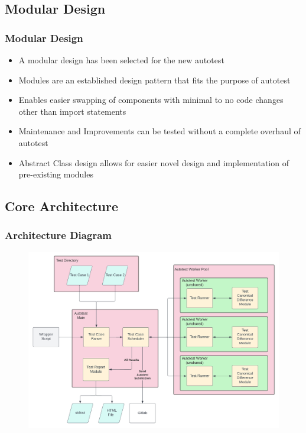 \documentclass[xcolor, handout]{beamer}
\begin{document}
\subsection{Modular Design}
\begin{frame}
	\frametitle{Modular Design}
	\begin{itemize}
		\item A modular design has been selected for the new autotest
			\pause
		\item Modules are an established design pattern that fits the purpose of autotest
			\pause
		\item Enables easier swapping of components with minimal to no code changes other than import statements
			\pause
		\item Maintenance and Improvements can be tested without a complete overhaul of autotest
			\pause
		\item Abstract Class design allows for easier novel design and implementation of pre-existing modules
	\end{itemize}
\end{frame}
\subsection{Core Architecture}
\begin{frame}
	\frametitle{Architecture Diagram}
	\begin{figure}
		\includegraphics[width=\textwidth, height=0.85\textheight, keepaspectratio=true]{architecture}
	\end{figure}
\end{frame}
\end{document}
